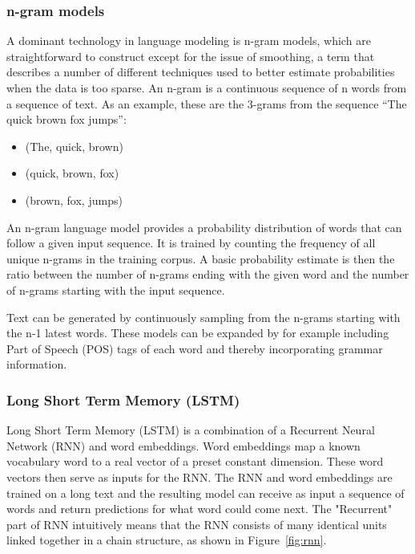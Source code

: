 \documentclass[12pt,a4paper,utf8]{article}
\begin{document}
\subsubsection{n-gram models}
A dominant technology in language modeling is n-gram models, which are straightforward to construct except for the issue of smoothing, a term that describes a number of different techniques used to better estimate probabilities when the data is too sparse\autocite{chen1996empirical}. An n-gram is a continuous sequence of n words from a sequence of text. As an example, these are the 3-grams from the sequence “The quick brown fox jumps”:

\begin{itemize}
\item (The, quick, brown)
\item (quick, brown, fox)
\item (brown, fox, jumps)
\end{itemize}

An n-gram language model provides a probability distribution of words that can follow a given input sequence. It is trained by counting the frequency of all unique n-grams in the training corpus. A basic probability estimate is then the ratio between the number of n-grams ending with the given word and the number of n-grams starting with the input sequence. 

Text can be generated by continuously sampling from the n-grams starting with the n-1 latest words. These models can be expanded by for example including Part of Speech (POS) tags of each word and thereby incorporating grammar information.

\subsubsection{Long Short Term Memory (LSTM)}

Long Short Term Memory (LSTM) is a combination of a Recurrent Neural Network (RNN) and word embeddings. Word embeddings map a known vocabulary word to a real vector of a preset constant dimension. These word vectors then serve as inputs for the RNN. The RNN and word embeddings are trained on a long text and the resulting model can receive as input a sequence of words and return predictions for what word could come next. The "Recurrent" part of RNN intuitively means that the RNN consists of many identical units linked together in a chain structure, as shown in Figure~\ref{fig:rnn}. 
\end{document}
